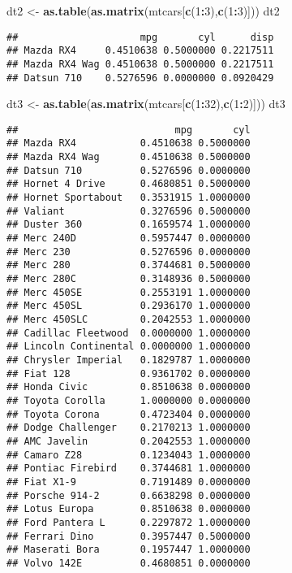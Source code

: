 \documentclass[]{article}
\newenvironment{Shaded}{\begin{snugshade}}{\end{snugshade}}
\newcommand{\KeywordTok}[1]{\textcolor[rgb]{0.13,0.29,0.53}{\textbf{#1}}}
\newcommand{\DecValTok}[1]{\textcolor[rgb]{0.00,0.00,0.81}{#1}}
\newcommand{\StringTok}[1]{\textcolor[rgb]{0.31,0.60,0.02}{#1}}
\newcommand{\OperatorTok}[1]{\textcolor[rgb]{0.81,0.36,0.00}{\textbf{#1}}}
\newcommand{\NormalTok}[1]{#1}
\begin{document}
\begin{Shaded}
\begin{Highlighting}[]
\NormalTok{dt2 <-}\StringTok{ }\KeywordTok{as.table}\NormalTok{(}\KeywordTok{as.matrix}\NormalTok{(mtcars[}\KeywordTok{c}\NormalTok{(}\DecValTok{1}\OperatorTok{:}\DecValTok{3}\NormalTok{),}\KeywordTok{c}\NormalTok{(}\DecValTok{1}\OperatorTok{:}\DecValTok{3}\NormalTok{)])) }
\NormalTok{dt2}
\end{Highlighting}
\end{Shaded}

\begin{verbatim}
##                     mpg       cyl      disp
## Mazda RX4     0.4510638 0.5000000 0.2217511
## Mazda RX4 Wag 0.4510638 0.5000000 0.2217511
## Datsun 710    0.5276596 0.0000000 0.0920429
\end{verbatim}

\begin{Shaded}
\begin{Highlighting}[]
\NormalTok{dt3 <-}\StringTok{ }\KeywordTok{as.table}\NormalTok{(}\KeywordTok{as.matrix}\NormalTok{(mtcars[}\KeywordTok{c}\NormalTok{(}\DecValTok{1}\OperatorTok{:}\DecValTok{32}\NormalTok{),}\KeywordTok{c}\NormalTok{(}\DecValTok{1}\OperatorTok{:}\DecValTok{2}\NormalTok{)])) }
\NormalTok{dt3}
\end{Highlighting}
\end{Shaded}

\begin{verbatim}
##                           mpg       cyl
## Mazda RX4           0.4510638 0.5000000
## Mazda RX4 Wag       0.4510638 0.5000000
## Datsun 710          0.5276596 0.0000000
## Hornet 4 Drive      0.4680851 0.5000000
## Hornet Sportabout   0.3531915 1.0000000
## Valiant             0.3276596 0.5000000
## Duster 360          0.1659574 1.0000000
## Merc 240D           0.5957447 0.0000000
## Merc 230            0.5276596 0.0000000
## Merc 280            0.3744681 0.5000000
## Merc 280C           0.3148936 0.5000000
## Merc 450SE          0.2553191 1.0000000
## Merc 450SL          0.2936170 1.0000000
## Merc 450SLC         0.2042553 1.0000000
## Cadillac Fleetwood  0.0000000 1.0000000
## Lincoln Continental 0.0000000 1.0000000
## Chrysler Imperial   0.1829787 1.0000000
## Fiat 128            0.9361702 0.0000000
## Honda Civic         0.8510638 0.0000000
## Toyota Corolla      1.0000000 0.0000000
## Toyota Corona       0.4723404 0.0000000
## Dodge Challenger    0.2170213 1.0000000
## AMC Javelin         0.2042553 1.0000000
## Camaro Z28          0.1234043 1.0000000
## Pontiac Firebird    0.3744681 1.0000000
## Fiat X1-9           0.7191489 0.0000000
## Porsche 914-2       0.6638298 0.0000000
## Lotus Europa        0.8510638 0.0000000
## Ford Pantera L      0.2297872 1.0000000
## Ferrari Dino        0.3957447 0.5000000
## Maserati Bora       0.1957447 1.0000000
## Volvo 142E          0.4680851 0.0000000
\end{verbatim}
\end{document}
